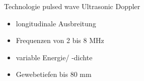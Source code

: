 \documentclass{beamer}
\begin{document}
\begin{frame}
{\begin{columns}
\begin{figure}[h]
		\end{figure}
		\begin{block}{Technologie pulsed wave Ultrasonic Doppler}
		\begin{itemize}			
			\item[\Checkmark] longitudinale Ausbreitung
			\item[\Checkmark] Frequenzen von 2 bis 8 MHz			
			\item[\Checkmark] variable Energie/ -dichte
			\item[\Checkmark] Gewebetiefen bis 80 mm
		\end{itemize}
		\end{block}
	\end{columns}}

\end{frame}
\end{document}
